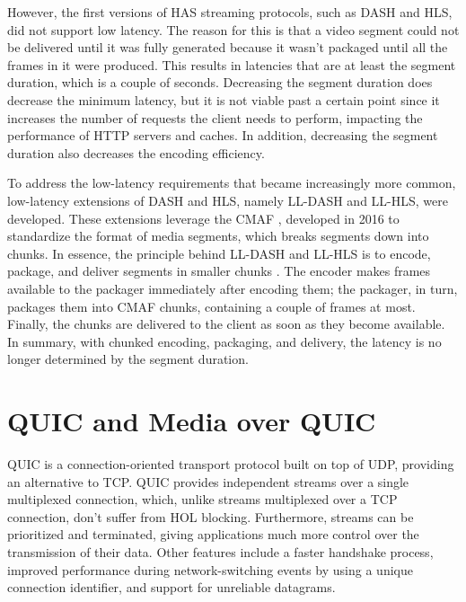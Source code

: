 However, the first versions of \ac{HAS} streaming protocols, such as \ac{DASH} and \ac{HLS}, did not support low latency. The reason for this is that a video segment could not be delivered until it was fully generated because it wasn't packaged until all the frames in it were produced. This results in latencies that are at least the segment duration, which is a couple of seconds. Decreasing the segment duration does decrease the minimum latency, but it is not viable past a certain point since it increases the number of requests the client needs to perform, impacting the performance of HTTP servers and caches. In addition, decreasing the segment duration also decreases the encoding efficiency.

To address the low-latency requirements that became increasingly more common, low-latency extensions of \ac{DASH} and \ac{HLS}, namely LL-DASH and LL-HLS, were developed. These extensions leverage the \ac{CMAF} \parencite{CMAF}, developed in 2016 to standardize the format of media segments, which breaks segments down into chunks. In essence, the principle behind LL-DASH and LL-HLS is to encode, package, and deliver segments in smaller chunks \parencite{bentalebOneSecondLatencyEvolution2023, durakEvaluatingPerformanceApple2020}. The encoder makes frames available to the packager immediately after encoding them; the packager, in turn, packages them into \ac{CMAF} chunks, containing a couple of frames at most. Finally, the chunks are delivered to the client as soon as they become available. In summary, with chunked encoding, packaging, and delivery, the latency is no longer determined by the segment duration.

\section{QUIC and Media over QUIC}
QUIC \parencite{iyengarQUICUDPBasedMultiplexed2021} is a connection-oriented transport protocol built on top of \acs{UDP}, providing an alternative to TCP. QUIC provides independent streams over a single multiplexed connection, which, unlike streams multiplexed over a TCP connection, don't suffer from \ac{HOL} blocking. Furthermore, streams can be prioritized and terminated, giving applications much more control over the transmission of their data. Other features include a faster handshake process, improved performance during network-switching events by using a unique connection identifier, and support for unreliable datagrams.

